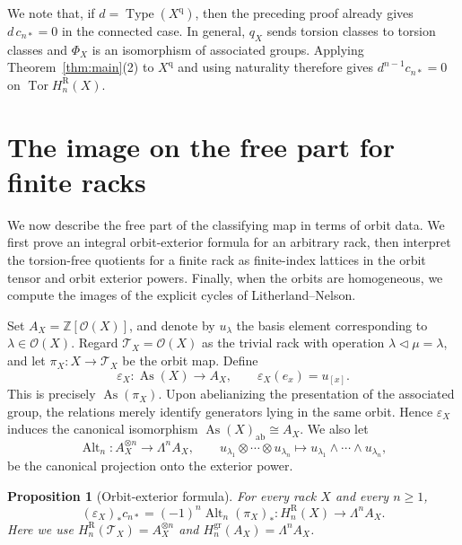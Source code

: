 \documentclass[11pt]{article}
\newtheorem{proposition}[theorem]{Proposition}
\DeclareMathOperator{\As}{As}
\DeclareMathOperator{\Tor}{Tor}
\DeclareMathOperator{\Type}{Type}
\newcommand{\ZZ}{\mathbb Z}
\newcommand{\OO}{\mathcal O}
\newcommand{\gr}{\mathrm{gr}}
\newcommand{\R}{\mathrm R}
\newcommand{\ab}{\mathrm{ab}}
\begin{document}
We note that, if $d=\Type(X^{\mathrm q})$, then the preceding proof already gives $d\,c_{n*}=0$ in the connected case. In general, $q_X$ sends torsion classes to torsion classes and $\Phi_X$ is an isomorphism of associated groups. Applying Theorem~\ref{thm:main}(2) to $X^{\mathrm q}$ and using
naturality therefore gives $d^{n-1}c_{n*}=0$ on $\Tor H_n^\R(X)$.


\section{The image on the free part for finite racks}
\label{sec:free-part-image}

We now describe the free part of the classifying map in terms of orbit data.
We first prove an integral orbit-exterior formula for an arbitrary rack, then
interpret the torsion-free quotients for a finite rack as finite-index
lattices in the orbit tensor and orbit exterior powers. Finally, when the
orbits are homogeneous, we compute the images of the explicit cycles of
Litherland--Nelson.

Set $A_X=\ZZ[\OO(X)]$, and denote by $u_\lambda$ the basis element
corresponding to $\lambda\in\OO(X)$. Regard
$\mathcal T_X=\OO(X)$ as the trivial rack with operation
$\lambda\lhd\mu=\lambda$, and let
$\pi_X\colon X\to\mathcal T_X$ be the orbit map. Define
\[
\varepsilon_X\colon\As(X)\longrightarrow A_X,
 \qquad
 \varepsilon_X(e_x)=u_{[x]}.
\]
This is precisely $\As(\pi_X)$. Upon abelianizing the presentation of the
associated group, the relations merely identify generators lying in the same
orbit. Hence $\varepsilon_X$ induces the canonical isomorphism
$\As(X)_{\ab}\cong A_X$. We also let
\[
 \operatorname{Alt}_n\colon A_X^{\otimes n}\longrightarrow\Lambda^nA_X,
 \qquad
 u_{\lambda_1}\otimes\cdots\otimes u_{\lambda_n}
 \longmapsto
 u_{\lambda_1}\wedge\cdots\wedge u_{\lambda_n},
\]
be the canonical projection onto the exterior power.

\begin{proposition}[Orbit-exterior formula]
\label{prop:orbit-exterior-formula}
For every rack $X$ and every $n\ge1$,
\begin{equation}
 (\varepsilon_X)_*c_{n*}
 =(-1)^n\operatorname{Alt}_n(\pi_X)_*
 \colon H_n^\R(X)\longrightarrow\Lambda^nA_X.
 \label{eq:orbit-exterior-formula}
\end{equation}
Here we use
$H_n^\R(\mathcal T_X)=A_X^{\otimes n}$ and
$H_n^{\gr}(A_X)=\Lambda^nA_X$.
\end{proposition}
\end{document}
